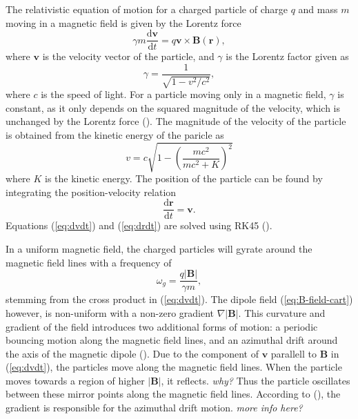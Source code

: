 The relativistic equation of motion for a charged particle of charge $q$ and mass $m$ moving in a magnetic field is given by the Lorentz force
\begin{equation}
    \gamma m \frac{\text{d}\bm{v}}{\text{d}t} = q\bm{v} \times \bm{B}(\bm{r}),
    \label{eq:dvdt}
\end{equation}
where $\bm{v}$ is the velocity vector of the particle, and $\gamma$ is the Lorentz factor given as
\begin{equation}
    \gamma = \frac{1}{\sqrt{1-v^2/c^2}},
\end{equation}
where $c$ is the speed of light. 
For a particle moving only in a magnetic field, $\gamma$ is constant, as it only depends on the squared magnitude of the velocity, which is unchanged by the Lorentz force (\cite{griffiths_2024}). 
The magnitude of the velocity of the particle is obtained from the kinetic energy of the paricle as
\begin{equation}
    v = c \sqrt{1-\left ( \frac{mc^2}{mc^2 + K}\right )^2}
    \label{eq:v}
\end{equation}
where $K$ is the kinetic energy. 
The position of the particle can be found by integrating the position-velocity relation
\begin{equation}
    \frac{\text{d}\bm{r}}{\text{d}t} = \bm{v}.
    \label{eq:drdt}
\end{equation}
Equations (\ref{eq:dvdt}) and (\ref{eq:drdt}) are solved using RK45 (\cite{DORMAND198019}). 

In a uniform magnetic field, the charged particles will gyrate around the magnetic field lines with a frequency of
\begin{equation}
    \omega_g = \frac{q|\bm{B}|}{\gamma m},
    \label{eq:omega-gyr}
\end{equation}
stemming from the cross product in (\ref{eq:dvdt}). 
The dipole field (\ref{eq:B-field-cart}) however, is non-uniform with a non-zero gradient $\nabla |\bm{B}|$. 
This curvature and gradient of the field introduces two additional forms of motion: a periodic bouncing motion along the magnetic field lines, and an azimuthal drift around the axis of the magnetic dipole (\cite{soni_2021}). 
Due to the component of $\bm{v}$ parallell to $\bm{B}$ in (\ref{eq:dvdt}), the particles move along the magnetic field lines.
When the particle moves towards a region of higher $|\bm{B}|$, it reflects. \textit{why?}
Thus the particle oscillates between these mirror points along the magnetic field lines.
According to (\cite{soni_2021}), the gradient is responsible for the azimuthal drift motion. \textit{more info here?}

